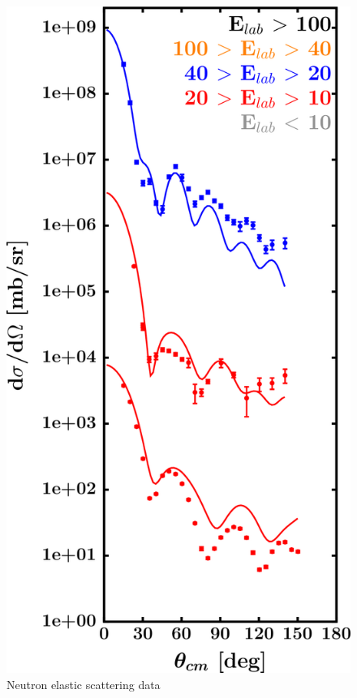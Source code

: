 \begin{figure}[H]
\begin{minipage}{0.45\textwidth}
        \includegraphics[width=1.0\textwidth]{figures/sn124_neutronElastic.png}
        \caption{Neutron elastic scattering data}
        \label{DOMFitData_sn124_neutron_elastic}
    \end{minipage}
\end{figure}

